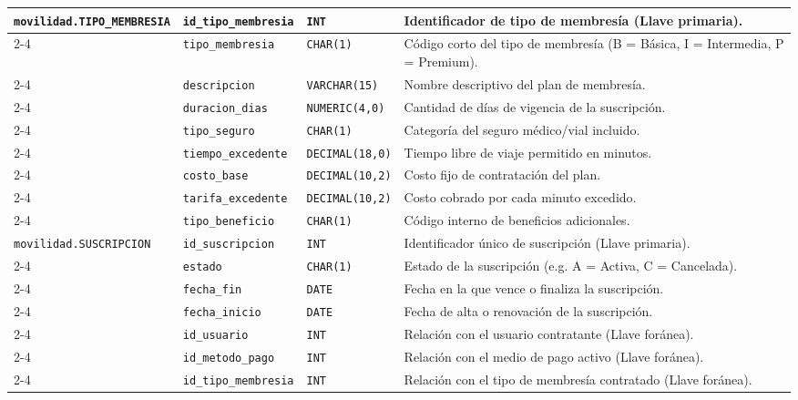 \begin{longtable}{|p{3.2cm}|p{2.7cm}|p{3.0cm}|p{6.0cm}|}
	\texttt{movilidad.TIPO\_MEMBRESIA} & \texttt{id\_tipo\_membresia} & \texttt{INT} & Identificador de tipo de membresía (Llave primaria). \\ \cline{2-4}
	& \texttt{tipo\_membresia} & \texttt{CHAR(1)} & Código corto del tipo de membresía (B = Básica, I = Intermedia, P = Premium). \\ \cline{2-4}
	& \texttt{descripcion} & \texttt{VARCHAR(15)} & Nombre descriptivo del plan de membresía. \\ \cline{2-4}
	& \texttt{duracion\_dias} & \texttt{NUMERIC(4,0)} & Cantidad de días de vigencia de la suscripción. \\ \cline{2-4}
	& \texttt{tipo\_seguro} & \texttt{CHAR(1)} & Categoría del seguro médico/vial incluido. \\ \cline{2-4}
	& \texttt{tiempo\_excedente} & \texttt{DECIMAL(18,0)} & Tiempo libre de viaje permitido en minutos. \\ \cline{2-4}
	& \texttt{costo\_base} & \texttt{DECIMAL(10,2)} & Costo fijo de contratación del plan. \\ \cline{2-4}
	& \texttt{tarifa\_excedente} & \texttt{DECIMAL(10,2)} & Costo cobrado por cada minuto excedido. \\ \cline{2-4}
	& \texttt{tipo\_beneficio} & \texttt{CHAR(1)} & Código interno de beneficios adicionales. \\ \hline
	
	\texttt{movilidad.SUSCRIPCION} & \texttt{id\_suscripcion} & \texttt{INT} & Identificador único de suscripción (Llave primaria). \\ \cline{2-4}
	& \texttt{estado} & \texttt{CHAR(1)} & Estado de la suscripción (e.g. A = Activa, C = Cancelada). \\ \cline{2-4}
	& \texttt{fecha\_fin} & \texttt{DATE} & Fecha en la que vence o finaliza la suscripción. \\ \cline{2-4}
	& \texttt{fecha\_inicio} & \texttt{DATE} & Fecha de alta o renovación de la suscripción. \\ \cline{2-4}
	& \texttt{id\_usuario} & \texttt{INT} & Relación con el usuario contratante (Llave foránea). \\ \cline{2-4}
	& \texttt{id\_metodo\_pago} & \texttt{INT} & Relación con el medio de pago activo (Llave foránea). \\ \cline{2-4}
	& \texttt{id\_tipo\_membresia} & \texttt{INT} & Relación con el tipo de membresía contratado (Llave foránea). \\ \hline
	

\end{longtable}
